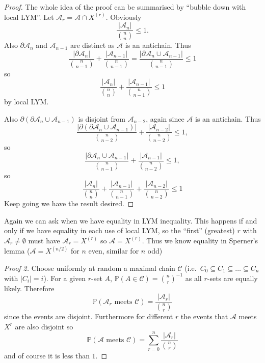 \documentclass[a4paper]{article}
\newcommand{\shadow}{\partial}
\renewcommand{\P}{\mathbb P}
\begin{document}
\begin{proof}
  The whole idea of the proof can be summarised by ``bubble down with local LYM''. Let \(\mathcal A_r = \mathcal A \cap X^{(r)}\). Obviously
  \[
    \frac{|\mathcal A_n|}{\binom{n}{n}} \leq 1.
  \]
  Also \(\shadow \mathcal A_n\) and \(\mathcal A_{n - 1}\) are distinct as \(\mathcal A\) is an antichain. Thus
  \[
    \frac{|\shadow \mathcal A_n|}{\binom{n}{n - 1}} + \frac{|\mathcal A_{n - 1}|}{\binom{n}{n - 1}}
    = \frac{|\shadow \mathcal A_n \cup \mathcal A_{n - 1}|}{\binom{n}{n - 1}} \leq 1
  \]
  so
  \[
    \frac{|\mathcal A_n|}{\binom{n}{n}} + \frac{|\mathcal A_{n - 1}|}{\binom{n}{n - 1}} \leq 1
  \]
  by local LYM.

  Also \(\shadow (\shadow \mathcal A_n \cup \mathcal A_{n - 1})\) is disjoint from \(\mathcal A_{n - 2}\), again since \(\mathcal A\) is an antichain. Thus
  \[
    \frac{|\shadow (\shadow \mathcal A_n \cup \mathcal A_{n -1})|}{\binom{n}{n - 2}} +\frac{|\mathcal A_{n - 2}|}{\binom{n}{n - 2}} \leq 1,
  \]
  so
  \[
    \frac{|\shadow \mathcal A_n \cup \mathcal A_{n - 1}|}{\binom{n}{n - 1}} + \frac{|\mathcal A_{n - 1}|}{\binom{n}{n - 2}} \leq 1,
  \]
  so
  \[
    \frac{|\mathcal A_n|}{\binom{n}{n}} + \frac{|\mathcal A_{n - 1}|}{\binom{n}{n - 1}} + \frac{|\mathcal A_{n - 2}|}{\binom{n}{n - 2}} \leq 1
  \]
  Keep going we have the result desired.
\end{proof}

Again we can ask when we have equality in LYM inequality. This happens if and only if we have equality in each use of local LYM, so the ``first'' (greatest) \(r\) with \(\mathcal A_r \neq \emptyset\) must have \(\mathcal A_r = X^{(r)}\) so \(\mathcal A = X^{(r)}\). Thus we know equality in Sperner's lemma (\(\mathcal A = X^{(n/2)}\) for \(n\) even, similar for \(n\) odd)

\begin{proof}[Proof 2]
  Choose uniformly at random a maximal chain \(\mathcal C\) (i.e.\ \(C_0 \subseteq C_1 \subseteq \dots \subseteq C_n\) with \(|C_i| = i\)). For a given \(r\)-set \(A\), \(\P(A \in \mathcal C) = \binom{n}{r}^{-1}\) as all \(r\)-sets are equally likely. Therefore
  \[
    \P(\mathcal A_r \text{ meets } \mathcal C) = \frac{|\mathcal A_r|}{\binom{n}{r}}
  \]
  since the events are disjoint. Furthermore for different \(r\) the events that \(\mathcal A\) meets \(X^r\) are also disjoint so
  \[
    \P(\mathcal A \text{ meets } \mathcal C) = \sum_{r = 0}^n \frac{|\mathcal A_r|}{\binom{n}{r}}
  \]
  and of course it is less than \(1\).
\end{proof}
\end{document}
